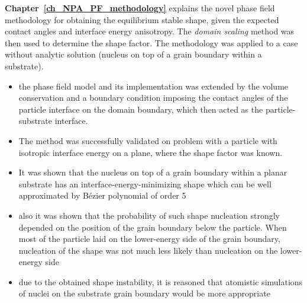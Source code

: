 \textbf{Chapter~\ref{ch_NPA_PF_methodology}} explains the novel phase field methodology for obtaining the equilibrium stable shape, given the expected contact angles and interface energy anisotropy. The \textit{domain scaling} method was then used to determine the shape factor. The methodology was applied to a case without analytic solution (nucleus on top of a grain boundary within a substrate).
\begin{itemize}
	\item the phase field model and its implementation was extended by the volume conservation and a boundary condition imposing the contact angles of the particle interface on the domain boundary, which then acted as the particle-substrate interface.
	\item The method was successfully validated on problem with a particle with isotropic interface energy on a plane, where the shape factor was known.
	\item It was shown that the nucleus on top of a grain boundary within a planar substrate has an interface-energy-minimizing shape which can be well approximated by Bézier polynomial of order 5
	\item also it was shown that the probability of such shape nucleation strongly depended on the position of the grain boundary below the particle. When most of the particle laid on the lower-energy side of the grain boundary, nucleation of the shape was not much less likely than nucleation on the lower-energy side
	\item due to the obtained shape instability, it is reasoned that atomistic simulations of nuclei on the substrate grain boundary would be more appropriate
\end{itemize}

